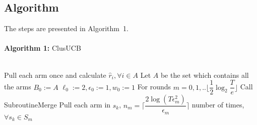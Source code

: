\subsection*{Algorithm}

The steps are presented in Algorithm~1.\\%
\noindent\makebox[\linewidth]{\rule{\textwidth}{0.8pt}}\\[-0.1cm]
\textbf{Algorithm 1:} ClusUCB\\[-0.3cm]
\noindent\makebox[\linewidth]{\rule{\textwidth}{0.4pt}}\\[-0.3cm]
\begin{algorithmic}[1]
\State Pull each arm once and calculate $\hat{r}_{i}, \forall i\in A$
\State Let $A$ be the set which contains all the arms
\State $B_{0}:=A$
\State $\ell_{0}:=2, \epsilon_{0}:=1, w_{0}:=1$
\State For rounds $m=0,1,..\big \lfloor \dfrac{1}{2}\log_{2} \dfrac{T}{e}\big\rfloor$
\State \hspace*{2em} Call SubroutineMerge
\State \hspace*{2em} Pull each arm in $s_{k}$, \newline\hspace*{2em}$n_{m}=\bigg\lceil\dfrac{2\log{(T\epsilon_{m}^{2})}}{\epsilon_{m}}\bigg\rceil$ number of times, $\forall s_{k}\in S_{m}$ 

\end{algorithmic}
